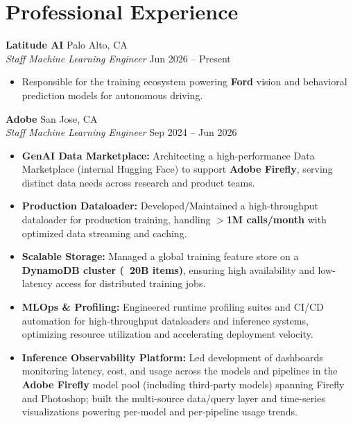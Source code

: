 \documentclass[10pt,letterpaper]{article}
\begin{document}
\section{Professional Experience}

\textbf{Latitude AI} \hfill Palo Alto, CA \\
\textit{Staff Machine Learning Engineer} \hfill Jun 2026 -- Present
\begin{itemize}
    \item Responsible for the training ecosystem powering \textbf{Ford} vision and behavioral prediction models for autonomous driving.
\end{itemize}

\textbf{Adobe} \hfill San Jose, CA \\
\textit{Staff Machine Learning Engineer} \hfill Sep 2024 -- Jun 2026
\begin{itemize}
    \item \textbf{GenAI Data Marketplace:} Architecting a high-performance Data Marketplace (internal Hugging Face) to support \textbf{Adobe Firefly}, serving distinct data needs across research and product teams.
    \item \textbf{Production Dataloader:} Developed/Maintained a high-throughput dataloader for production training, handling \textbf{$>$1M calls/month} with optimized data streaming and caching.
    \item \textbf{Scalable Storage:} Managed a global training feature store on a \textbf{DynamoDB cluster (~20B items)}, ensuring high availability and low-latency access for distributed training jobs.
    \item \textbf{MLOps \& Profiling:} Engineered runtime profiling suites and CI/CD automation for high-throughput dataloaders and inference systems, optimizing resource utilization and accelerating deployment velocity.
    \item \textbf{Inference Observability Platform:} Led development of dashboards monitoring latency, cost, and usage across the models and pipelines in the \textbf{Adobe Firefly} model pool (including third-party models) spanning Firefly and Photoshop; built the multi-source data/query layer and time-series visualizations powering per-model and per-pipeline usage trends.
\end{itemize}
\end{document}
